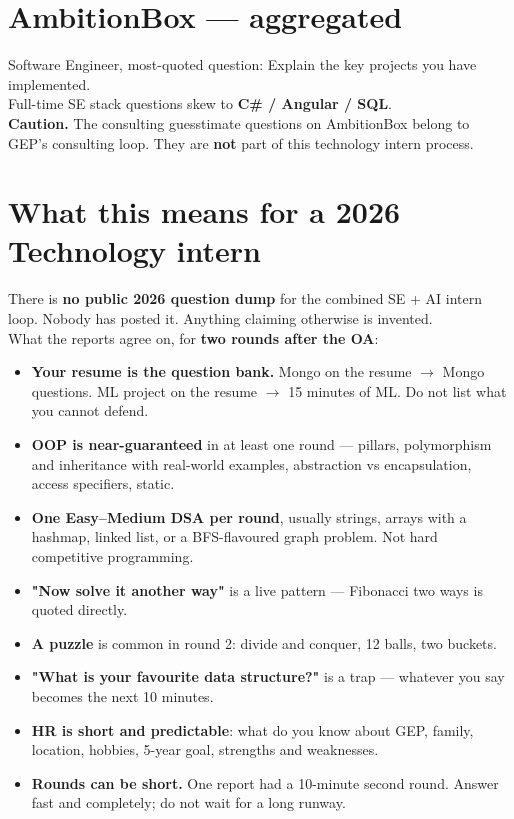 \documentclass[11pt,a4paper]{article}
\newcommand{\q}[1]{\textcolor{qcol}{#1}}
\newcommand{\card}[1]{%
  \par\vspace{5pt}%
  \noindent\colorbox{soft}{%
    \parbox{\dimexpr\textwidth-2\fboxsep}{\vspace{6pt}#1\vspace{6pt}}%
  }\par\vspace{7pt}%
}
\begin{document}
\section{AmbitionBox --- aggregated}
\card{
Software Engineer, most-quoted question: \q{Explain the key projects you have implemented.}\\[4pt]
Full-time SE stack questions skew to \textbf{C\# / Angular / SQL}.\\[4pt]
\textbf{Caution.} The consulting guesstimate questions on AmbitionBox belong to GEP's consulting loop. They are \textbf{not} part of this technology intern process.
}

\section{What this means for a 2026 Technology intern}
\card{
There is \textbf{no public 2026 question dump} for the combined SE + AI intern loop. Nobody has posted it. Anything claiming otherwise is invented.\\[6pt]
What the reports agree on, for \textbf{two rounds after the OA}:
\begin{itemize}
  \item \textbf{Your resume is the question bank.} Mongo on the resume $\rightarrow$ Mongo questions. ML project on the resume $\rightarrow$ 15 minutes of ML. Do not list what you cannot defend.
  \item \textbf{OOP is near-guaranteed} in at least one round --- pillars, polymorphism and inheritance with real-world examples, abstraction vs encapsulation, access specifiers, static.
  \item \textbf{One Easy--Medium DSA per round}, usually strings, arrays with a hashmap, linked list, or a BFS-flavoured graph problem. Not hard competitive programming.
  \item \textbf{"Now solve it another way"} is a live pattern --- Fibonacci two ways is quoted directly.
  \item \textbf{A puzzle} is common in round 2: divide and conquer, 12 balls, two buckets.
  \item \textbf{"What is your favourite data structure?"} is a trap --- whatever you say becomes the next 10 minutes.
  \item \textbf{HR is short and predictable}: what do you know about GEP, family, location, hobbies, 5-year goal, strengths and weaknesses.
  \item \textbf{Rounds can be short.} One report had a 10-minute second round. Answer fast and completely; do not wait for a long runway.
\end{itemize}
}
\end{document}
